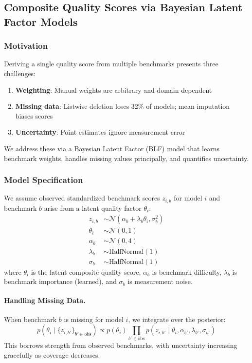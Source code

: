 \subsection{Composite Quality Scores via Bayesian Latent Factor Models}
\label{sec:blf}

\subsubsection{Motivation}

Deriving a single quality score from multiple benchmarks presents three challenges:
%
\begin{enumerate}[nosep]
\item \textbf{Weighting}: Manual weights are arbitrary and domain-dependent
\item \textbf{Missing data}: Listwise deletion loses 32\% of models; mean imputation biases scores
\item \textbf{Uncertainty}: Point estimates ignore measurement error
\end{enumerate}
%
We address these via a Bayesian Latent Factor (BLF) model that learns benchmark weights, handles missing values principally, and quantifies uncertainty.

\subsubsection{Model Specification}

We assume observed standardized benchmark scores $z_{i,b}$ for model $i$ and benchmark $b$ arise from a latent quality factor $\theta_i$:
%
\begin{align}
z_{i,b} &\sim \mathcal{N}(\alpha_b + \lambda_b \theta_i, \sigma_b^2) \\
\theta_i &\sim \mathcal{N}(0, 1) \\
\alpha_b &\sim \mathcal{N}(0, 4) \\
\lambda_b &\sim \text{HalfNormal}(1) \\
\sigma_b &\sim \text{HalfNormal}(1)
\end{align}
%
where $\theta_i$ is the latent composite quality score, $\alpha_b$ is benchmark difficulty, $\lambda_b$ is benchmark importance (learned), and $\sigma_b$ is measurement noise.

\paragraph{Handling Missing Data.}
When benchmark $b$ is missing for model $i$, we integrate over the posterior:
%
\begin{equation}
p(\theta_i \mid \{z_{i,b'}\}_{b' \in \text{obs}}) \propto p(\theta_i) \prod_{b' \in \text{obs}} p(z_{i,b'} \mid \theta_i, \alpha_{b'}, \lambda_{b'}, \sigma_{b'})
\end{equation}
%
This borrows strength from observed benchmarks, with uncertainty increasing gracefully as coverage decreases.

